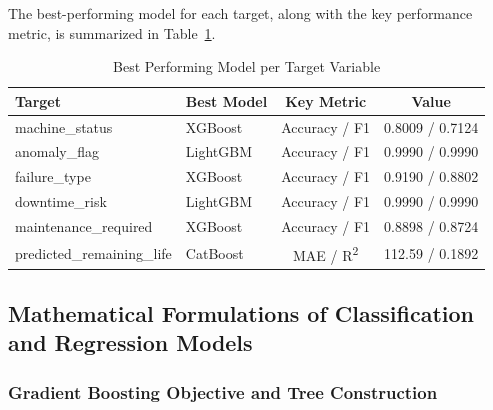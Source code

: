 The best-performing model for each target, along with the key performance metric, is summarized in Table~\ref{tab:best_mdl}.
\begin{table}[!htbp]
\centering
\caption{Best Performing Model per Target Variable}
\label{tab:best_mdl}
\begin{tabular}{llcc}
\hline
\textbf{Target} & \textbf{Best Model} & \textbf{Key Metric} & \textbf{Value} \\
\hline
machine\_status        & XGBoost    & Accuracy / F1   & 0.8009 / 0.7124 \\
anomaly\_flag          & LightGBM   & Accuracy / F1   & 0.9990 / 0.9990 \\
failure\_type          & XGBoost    & Accuracy / F1   & 0.9190 / 0.8802 \\
downtime\_risk         & LightGBM   & Accuracy / F1   & 0.9990 / 0.9990 \\
maintenance\_required  & XGBoost    & Accuracy / F1   & 0.8898 / 0.8724 \\
predicted\_remaining\_life & CatBoost & MAE / R\textsuperscript{2} & 112.59 / 0.1892 \\
\hline
\end{tabular}
\end{table}
\subsection{Mathematical Formulations of Classification and Regression Models}

\subsubsection{Gradient Boosting Objective and Tree Construction}

